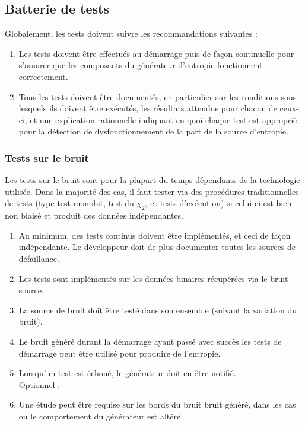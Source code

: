\subsection{Batterie de tests}
Globalement, les tests doivent suivre les recommandations suivantes :
\begin{enumerate}
\item Les tests doivent être effectués au démarrage puis de façon continuelle pour s'assurer que les composants du générateur d'entropie fonctionnent correctement.
\item Tous les tests doivent être documentés, en particulier sur les conditions sous lesquels ils doivent être exécutés, les résultats attendus pour chacun de ceux-ci, et une explication rationnelle indiquant en quoi chaque test est approprié pour la détection de dysfonctionnement de la part de la source d'entropie. 
\end{enumerate}

\subsubsection{Tests sur le bruit}
Les tests sur le bruit sont pour la plupart du temps dépendants de la technologie utilisée. Dans la majorité des cas, il faut tester via des procédures traditionnelles de tests (type test monobit, test du $\chi_2$, et tests d'exécution) si celui-ci est bien non biaisé et produit des données indépendantes.
\begin{enumerate}
\item Au minimum, des tests continus doivent être implémentés, et ceci de façon indépendante. Le développeur doit de plus documenter toutes les sources de défaillance.
\item Les tests sont implémentés sur les données binaires récupérées via le bruit source.
\item La source de bruit doit être testé dans son ensemble (suivant la variation du bruit).
\item Le bruit généré durant la démarrage ayant passé avec succès les tests de démarrage peut être utilisé pour produire de l'entropie.
\item Lorsqu'un test est échoué, le générateur doit en être notifié.\\

Optionnel : 
\item Une étude peut être requise sur les bords du bruit bruit généré, dans les cas ou le comportement du générateur est altéré.
\end{enumerate}



